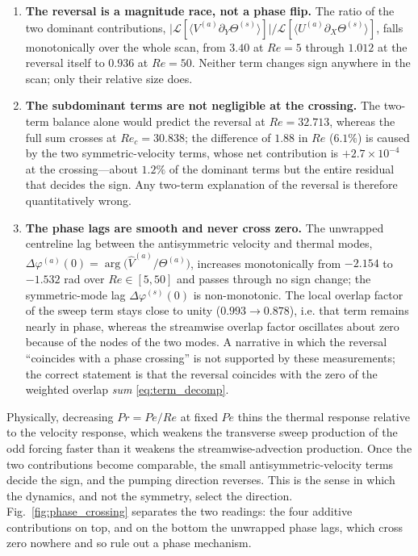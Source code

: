 \documentclass[12pt,a4paper]{article}
\newcommand{\Rey}{\mathit{Re}}
\newcommand{\Pe}{\mathit{Pe}}
\renewcommand{\Pr}{\mathit{Pr}}
\begin{document}
\begin{enumerate}
  \item \textbf{The reversal is a magnitude race, not a phase flip.} The ratio of the
  two dominant contributions,
  $\big|\mathcal L[\langle V^{(a)}\partial_Y\Theta^{(s)}\rangle]\big|
  /\mathcal L[\langle U^{(a)}\partial_X\Theta^{(s)}\rangle]$,
  falls monotonically over the whole scan, from $3.40$ at $\Rey=5$ through $1.012$
  at the reversal itself to $0.936$ at $\Rey=50$. Neither term changes sign anywhere
  in the scan; only their relative size does.
  \item \textbf{The subdominant terms are not negligible at the crossing.} The
  two-term balance alone would predict the reversal at $\Rey=32.713$, whereas the full
  sum crosses at $\Rey_c=30.838$; the difference of $1.88$ in $\Rey$ ($6.1\%$) is caused
  by the two symmetric-velocity terms, whose net contribution is $+2.7\times10^{-4}$
  at the crossing---about $1.2\%$ of the dominant terms but the entire residual that
  decides the sign. Any two-term explanation of the reversal is
  therefore quantitatively wrong.
  \item \textbf{The phase lags are smooth and never cross zero.} The unwrapped
  centreline lag between the antisymmetric velocity and thermal modes,
  $\Delta\varphi^{(a)}(0)=\arg\!\big(\widehat V^{(a)}/\Theta^{(a)}\big)$, increases
  monotonically from $-2.154$ to $-1.532$ rad over $\Rey\in[5,50]$ and passes through
  no sign change; the symmetric-mode lag $\Delta\varphi^{(s)}(0)$ is non-monotonic.
  The local overlap factor of the sweep term stays close to unity
  ($0.993\rightarrow0.878$), i.e. that term remains nearly in phase, whereas the
  streamwise overlap factor oscillates about zero because of the nodes of the two
  modes. A narrative in which the reversal ``coincides with a phase crossing'' is not
  supported by these measurements; the correct statement is that the reversal coincides
  with the zero of the weighted overlap \emph{sum} \eqref{eq:term_decomp}.
\end{enumerate}

Physically, decreasing $\Pr=\Pe/\Rey$ at fixed $\Pe$ thins the thermal response relative
to the velocity response, which weakens the transverse sweep production of the odd
forcing faster than it weakens the streamwise-advection production. Once the two
contributions become comparable, the small antisymmetric-velocity terms decide the
sign, and the pumping direction reverses. This is the sense in which the dynamics, and
not the symmetry, select the direction.
Fig.~\ref{fig:phase_crossing} separates the two readings: the four additive contributions on top,
and on the bottom the unwrapped phase lags, which cross zero nowhere and so rule out a phase
mechanism.
\end{document}
